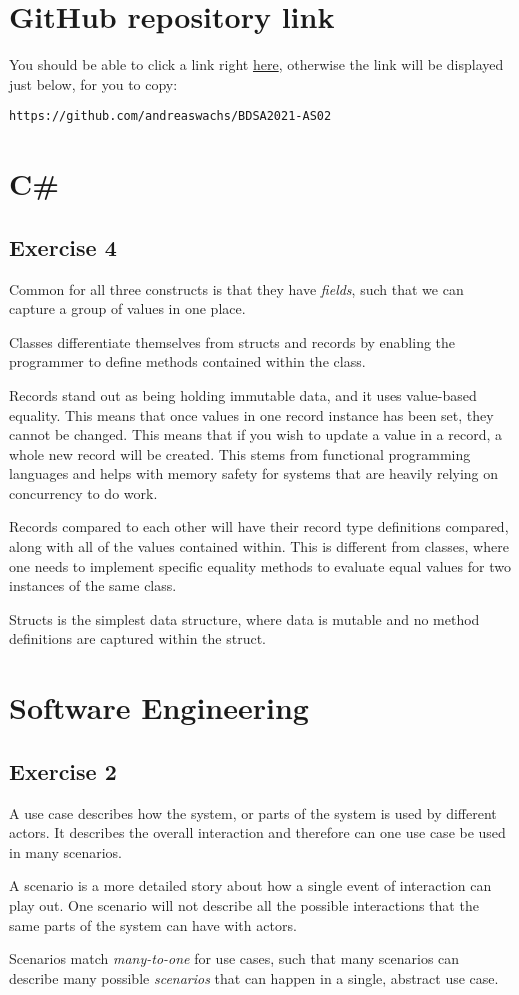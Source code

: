 \documentclass[12pt,letterpaper]{article}
\begin{document}
\section{GitHub repository link}

You should be able to click a link right \href{https://github.com/andreaswachs/BDSA2021-AS02}{here}, 
otherwise the link will be displayed just below, for you to copy:

\lstinline{https://github.com/andreaswachs/BDSA2021-AS02}


\section{C\#}

\subsection{Exercise 4}

Common for all three constructs is that they have \textit{fields}, such that we can capture a group of values in one place.

Classes differentiate themselves from structs and records by enabling the programmer to define methods contained within the class.

Records stand out as being holding immutable data, and it uses value-based equality. This means that once values in one record instance has been set, they cannot be changed. This means that if you wish to update a value in a record, a whole new record will be created. This stems from functional programming languages and helps with memory safety for systems that are heavily relying on concurrency to do work.

Records compared to each other will have their record type definitions compared, along with all of the values contained within. This is different from classes, where one needs to implement specific equality methods to evaluate equal values for two instances of the same class.

Structs is the simplest data structure, where data is mutable and no method definitions are captured within the struct. 

\section{Software Engineering}

\subsection{Exercise 2}

A use case describes how the system, or parts of the system is used by different actors. It describes the overall interaction and therefore can one use case be used in many scenarios.

A scenario is a more detailed story about how a single event of interaction can play out. One scenario will not describe all the possible interactions that the same parts of the system can have with actors.

Scenarios match \textit{many-to-one} for use cases, such that many scenarios can describe many possible \textit{scenarios} that can happen in a single, abstract use case.
\end{document}

